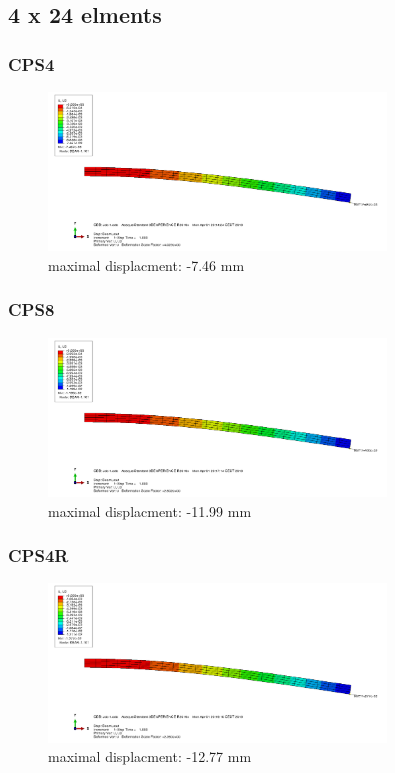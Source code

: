 \documentclass[12pt]{article}
\begin{document}
\subsection{4 x 24 elments}

\subsubsection{CPS4}
\begin{figure}[!htb]
  \centering
  \includegraphics[width=0.8\textwidth]{pics/4_24_CPS4}
  \caption{maximal displacment: -7.46 mm}
\end{figure}
\FloatBarrier
\subsubsection{CPS8}
\begin{figure}[!htb]
  \centering
  \includegraphics[width=0.8\textwidth]{pics/4_24_CPS8}
  \caption{maximal displacment: -11.99 mm}
\end{figure}
\FloatBarrier
\pagebreak
\subsubsection{CPS4R}
\begin{figure}[!htb]
  \centering
  \includegraphics[width=0.8\textwidth]{pics/4_24_CPS4R}
  \caption{maximal displacment: -12.77 mm}
\end{figure}
\FloatBarrier
\end{document}
